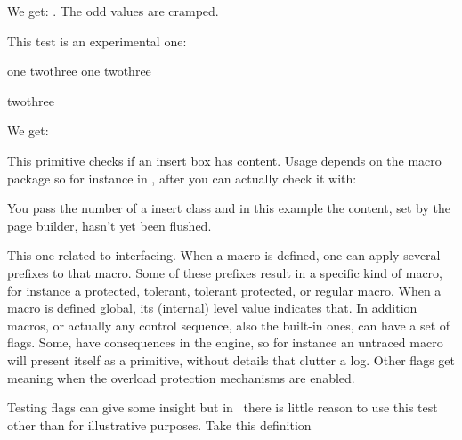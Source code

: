 \typebuffer[option=TEX]

We get: \inlinebuffer. The odd values are cramped.


\stopsectionlevel

\startsectionlevel[title={\tex{ifinalignment}}]

This test is an experimental one:

\startbuffer
\halign \bgroup
    \aligncontent
    \aligntab
    \aligncontent
    \cr
    one \aligntab \ifinalignment two\else three\fi \cr
    one \aligntab \hbox{\ifinalignment two\else three\fi} \cr
\egroup

\hbox{\ifinalignment two\else three\fi}
\stopbuffer

\typebuffer[option=TEX]

We get:

\startpacked\getbuffer \stoppacked

\stopsectionlevel

\startsectionlevel[title={\tex{ifinsert}}]

This primitive checks if an insert box has content. Usage depends on the macro
package so for instance in \CONTEXT, after  you can
actually check it with:

\starttyping[option=TEX]
\stoptyping

You pass the number of a insert class and in this example the content, set by the
page builder, hasn't yet been flushed.

\stopsectionlevel

\startsectionlevel[title={\tex{ifflags}}]

This one related to interfacing. When a macro is defined, one can apply several
prefixes to that macro. Some of these prefixes result in a specific kind of
macro, for instance a protected, tolerant, tolerant protected, or regular macro.
When a macro is defined global, its (internal) level value indicates that. In
addition macros, or actually any control sequence, also the built-in ones, can
have a set of flags. Some, have consequences in the engine, so for instance an
untraced macro will present itself as a primitive, without details that clutter a
log. Other flags get meaning when the overload protection mechanisms are enabled.

Testing flags can give some insight but in \CONTEXT\ there is little reason to
use this test other than for illustrative purposes. Take this definition

